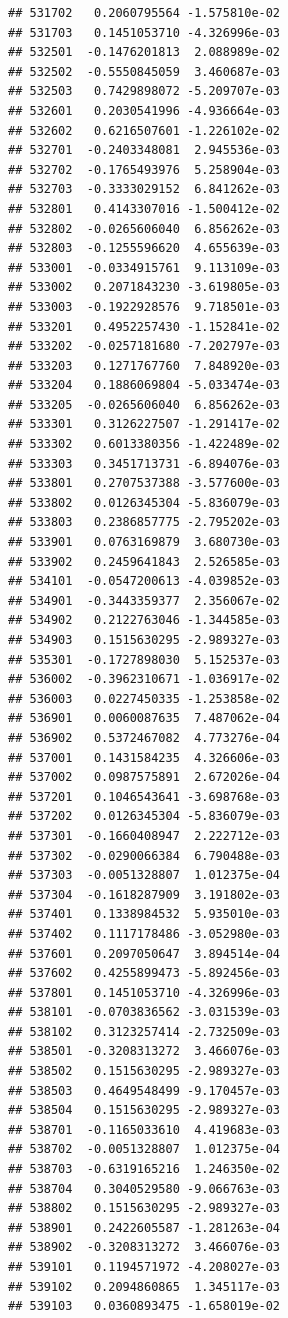 \documentclass[ignorenonframetext,]{beamer}
\begin{document}
\begin{frame}[fragile]
\begin{verbatim}
## 531702   0.2060795564 -1.575810e-02
## 531703   0.1451053710 -4.326996e-03
## 532501  -0.1476201813  2.088989e-02
## 532502  -0.5550845059  3.460687e-03
## 532503   0.7429898072 -5.209707e-03
## 532601   0.2030541996 -4.936664e-03
## 532602   0.6216507601 -1.226102e-02
## 532701  -0.2403348081  2.945536e-03
## 532702  -0.1765493976  5.258904e-03
## 532703  -0.3333029152  6.841262e-03
## 532801   0.4143307016 -1.500412e-02
## 532802  -0.0265606040  6.856262e-03
## 532803  -0.1255596620  4.655639e-03
## 533001  -0.0334915761  9.113109e-03
## 533002   0.2071843230 -3.619805e-03
## 533003  -0.1922928576  9.718501e-03
## 533201   0.4952257430 -1.152841e-02
## 533202  -0.0257181680 -7.202797e-03
## 533203   0.1271767760  7.848920e-03
## 533204   0.1886069804 -5.033474e-03
## 533205  -0.0265606040  6.856262e-03
## 533301   0.3126227507 -1.291417e-02
## 533302   0.6013380356 -1.422489e-02
## 533303   0.3451713731 -6.894076e-03
## 533801   0.2707537388 -3.577600e-03
## 533802   0.0126345304 -5.836079e-03
## 533803   0.2386857775 -2.795202e-03
## 533901   0.0763169879  3.680730e-03
## 533902   0.2459641843  2.526585e-03
## 534101  -0.0547200613 -4.039852e-03
## 534901  -0.3443359377  2.356067e-02
## 534902   0.2122763046 -1.344585e-03
## 534903   0.1515630295 -2.989327e-03
## 535301  -0.1727898030  5.152537e-03
## 536002  -0.3962310671 -1.036917e-02
## 536003   0.0227450335 -1.253858e-02
## 536901   0.0060087635  7.487062e-04
## 536902   0.5372467082  4.773276e-04
## 537001   0.1431584235  4.326606e-03
## 537002   0.0987575891  2.672026e-04
## 537201   0.1046543641 -3.698768e-03
## 537202   0.0126345304 -5.836079e-03
## 537301  -0.1660408947  2.222712e-03
## 537302  -0.0290066384  6.790488e-03
## 537303  -0.0051328807  1.012375e-04
## 537304  -0.1618287909  3.191802e-03
## 537401   0.1338984532  5.935010e-03
## 537402   0.1117178486 -3.052980e-03
## 537601   0.2097050647  3.894514e-04
## 537602   0.4255899473 -5.892456e-03
## 537801   0.1451053710 -4.326996e-03
## 538101  -0.0703836562 -3.031539e-03
## 538102   0.3123257414 -2.732509e-03
## 538501  -0.3208313272  3.466076e-03
## 538502   0.1515630295 -2.989327e-03
## 538503   0.4649548499 -9.170457e-03
## 538504   0.1515630295 -2.989327e-03
## 538701  -0.1165033610  4.419683e-03
## 538702  -0.0051328807  1.012375e-04
## 538703  -0.6319165216  1.246350e-02
## 538704   0.3040529580 -9.066763e-03
## 538802   0.1515630295 -2.989327e-03
## 538901   0.2422605587 -1.281263e-04
## 538902  -0.3208313272  3.466076e-03
## 539101   0.1194571972 -4.208027e-03
## 539102   0.2094860865  1.345117e-03
## 539103   0.0360893475 -1.658019e-02

\end{verbatim}
\end{frame}
\end{document}
